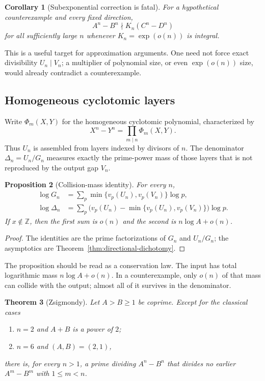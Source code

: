 \documentclass[11pt,oneside]{article}
\newtheorem{theorem}{Theorem}[section]
\newtheorem{proposition}[theorem]{Proposition}
\newtheorem{corollary}[theorem]{Corollary}
\theoremstyle{definition}
\theoremstyle{remark}
\newcommand{\Z}{\mathbb Z}
\begin{document}
\begin{corollary}[Subexponential correction is fatal]
\label{cor:subexp-correction}
For a hypothetical counterexample and every fixed direction,
\[
 A^n-B^n\nmid K_n(C^n-D^n)
\]
for all sufficiently large $n$ whenever $K_n=\exp(o(n))$ is integral.
\end{corollary}

This is a useful target for approximation arguments.  One need not force exact divisibility
$U_n\mid V_n$; a multiplier of polynomial size, or even $\exp(o(n))$ size, would already
contradict a counterexample.

\subsection{Homogeneous cyclotomic layers}

Write $\Phi_m(X,Y)$ for the homogeneous cyclotomic polynomial, characterized by
\[
 X^n-Y^n=\prod_{m\mid n}\Phi_m(X,Y).
\]
Thus $U_n$ is assembled from layers indexed by divisors of $n$.  The denominator
$\Delta_n=U_n/G_n$ measures exactly the prime-power mass of those layers that is not
reproduced by the output gap $V_n$.

\begin{proposition}[Collision-mass identity]
\label{prop:collision-mass}
For every $n$,
\begin{align*}
 \log G_n
 &=\sum_p\min\{v_p(U_n),v_p(V_n)\}\log p,\\
 \log\Delta_n
 &=\sum_p\bigl(v_p(U_n)-\min\{v_p(U_n),v_p(V_n)\}\bigr)\log p.
\end{align*}
If $x\notin\Z$, then the first sum is $o(n)$ and the second is
$n\log A+o(n)$.
\end{proposition}

\begin{proof}
The identities are the prime factorizations of $G_n$ and $U_n/G_n$; the asymptotics are
Theorem~\ref{thm:directional-dichotomy}.
\end{proof}

The proposition should be read as a conservation law.  The input has total logarithmic mass
$n\log A+o(n)$.  In a counterexample, only $o(n)$ of that mass can collide with the output;
almost all of it survives in the denominator.

\begin{theorem}[Zsigmondy]
\label{thm:zsigmondy}
Let $A>B\ge1$ be coprime.  Except for the classical cases
\begin{enumerate}[label=\textup{(\roman*)}]
\item $n=2$ and $A+B$ is a power of $2$;
\item $n=6$ and $(A,B)=(2,1)$,
\end{enumerate}
there is, for every $n>1$, a prime dividing $A^n-B^n$ that divides no earlier
$A^m-B^m$ with $1\le m<n$.
\end{theorem}
\end{document}
